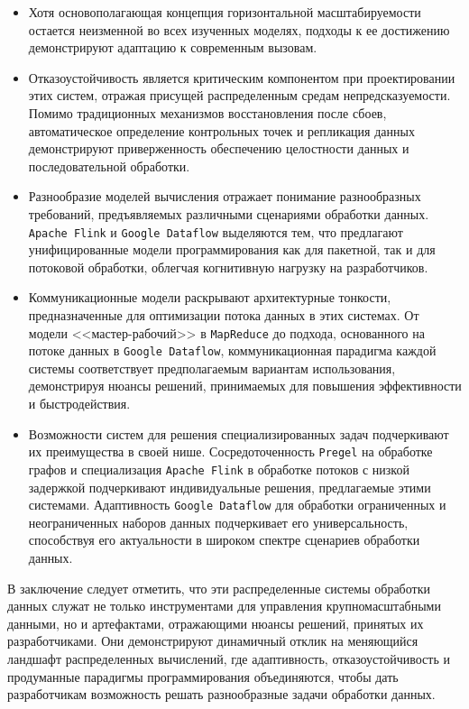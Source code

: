 %
\begin{itemize}
    \item Хотя основополагающая концепция горизонтальной масштабируемости остается неизменной во всех изученных моделях, подходы к ее достижению демонстрируют адаптацию к современным вызовам.

    \item Отказоустойчивость является критическим компонентом при проектировании этих систем, отражая присущей распределенным средам непредсказуемости.
    		Помимо традиционных механизмов восстановления после сбоев, автоматическое определение контрольных точек и репликация данных демонстрируют приверженность обеспечению целостности данных и последовательной обработки.

    \item Разнообразие моделей вычисления отражает понимание разнообразных требований, предъявляемых различными сценариями обработки данных.
      \texttt{Apache Flink} и \texttt{Google Dataflow} выделяются тем, что предлагают унифицированные модели программирования как для пакетной, так и для потоковой обработки, облегчая когнитивную нагрузку на разработчиков.

    \item Коммуникационные модели раскрывают архитектурные тонкости, предназначенные для оптимизации потока данных в этих системах.
      От модели <<мастер-рабочий>> в \texttt{MapReduce} до подхода, основанного на потоке данных в \texttt{Google Dataflow}, коммуникационная парадигма каждой системы соответствует предполагаемым вариантам использования, демонстрируя нюансы решений, принимаемых для повышения эффективности и быстродействия.

    \item Возможности систем для решения специализированных задач подчеркивают их преимущества в своей нише. Сосредоточенность \texttt{Pregel} на обработке графов и специализация \texttt{Apache Flink} в обработке потоков с низкой задержкой подчеркивают индивидуальные решения, предлагаемые этими системами.
      Адаптивность \texttt{Google Dataflow} для обработки ограниченных и неограниченных наборов данных подчеркивает его универсальность, способствуя его актуальности в широком спектре сценариев обработки данных.
\end{itemize}

\clearpage

В заключение следует отметить, что эти распределенные системы обработки данных служат не только инструментами для управления крупномасштабными данными, но и артефактами, отражающими нюансы решений, принятых их разработчиками. Они демонстрируют динамичный отклик на меняющийся ландшафт распределенных вычислений, где адаптивность, отказоустойчивость и продуманные парадигмы программирования объединяются, чтобы дать разработчикам возможность решать разнообразные задачи обработки данных.

\clearpage
